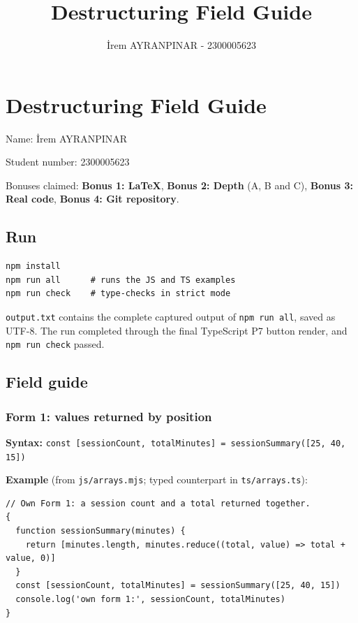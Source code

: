 \documentclass[
  11pt,
]{article}
\title{Destructuring Field Guide}
\author{İrem AYRANPINAR - 2300005623}
\date{}
\newcommand{\passthrough}[1]{#1}
\begin{document}
\maketitle

{
\setcounter{tocdepth}{3}
\tableofcontents
}
\section{Destructuring Field Guide}\label{destructuring-field-guide}

Name: İrem AYRANPINAR

Student number: 2300005623

Bonuses claimed: \textbf{Bonus 1: LaTeX}, \textbf{Bonus 2: Depth} (A, B
and C), \textbf{Bonus 3: Real code}, \textbf{Bonus 4: Git repository}.

\subsection{Run}\label{run}

\begin{lstlisting}
npm install
npm run all      # runs the JS and TS examples
npm run check    # type-checks in strict mode
\end{lstlisting}

\passthrough{\lstinline!output.txt!} contains the complete captured
output of \passthrough{\lstinline!npm run all!}, saved as UTF-8. The run
completed through the final TypeScript P7 button render, and
\passthrough{\lstinline!npm run check!} passed.

\subsection{Field guide}\label{field-guide}

\subsubsection{Form 1: values returned by
position}\label{form-1-values-returned-by-position}

\textbf{Syntax:}
\passthrough{\lstinline!const [sessionCount, totalMinutes] = sessionSummary([25, 40, 15])!}

\textbf{Example} (from \passthrough{\lstinline!js/arrays.mjs!}; typed
counterpart in \passthrough{\lstinline!ts/arrays.ts!}):

\begin{lstlisting}
// Own Form 1: a session count and a total returned together.
{
  function sessionSummary(minutes) {
    return [minutes.length, minutes.reduce((total, value) => total + value, 0)]
  }
  const [sessionCount, totalMinutes] = sessionSummary([25, 40, 15])
  console.log('own form 1:', sessionCount, totalMinutes)
}
\end{lstlisting}
\end{document}
